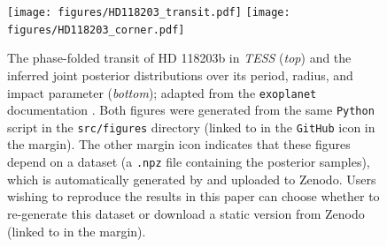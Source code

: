\documentclass[twocolumn]{aastex631}
\begin{document}
\begin{figure}[ht!]
    \begin{centering}
        \texttt{[image: figures/HD118203\_transit.pdf]}
        \texttt{[image: figures/HD118203\_corner.pdf]}
        \caption{
            The phase-folded transit of HD 118203b in \emph{TESS} (\emph{top}) and the inferred joint posterior distributions over its period, radius, and impact parameter (\emph{bottom}); adapted from the \texttt{exoplanet} documentation \citep{ForemanMackey2021}.
            Both figures were generated from the same \texttt{Python} script in the \texttt{src/figures} directory (linked to in the \texttt{GitHub} icon in the margin). The other margin icon indicates that these figures depend on a dataset (a \texttt{.npz} file containing the posterior samples), which is automatically generated by \showyourwork and uploaded to Zenodo. 
            Users wishing to reproduce the results in this paper can choose whether to re-generate this dataset or download a static version from Zenodo (linked to in the margin).
        }
        \label{fig:HD118203}
    \end{centering}
\end{figure}
\end{document}
